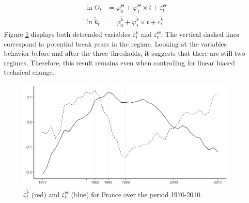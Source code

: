 \begin{align*}
	\ln \Theta_t &= \varphi_0^\Theta + \varphi_1^\Theta \times t + \varepsilon_t^\Theta \\
	\ln \tilde{k}_t &= \varphi_0^{\tilde{k}} + \varphi_1^{\tilde{k}} \times t + \varepsilon_t^{\tilde{k}}
\end{align*}
Figure \ref{fig:k_Theta_log_detrend} displays both detrended variables $\varepsilon_t^{\tilde{k}}$ and $\varepsilon_t^\Theta$. The vertical dashed lines correspond to potential break years in the regime. Looking at the variables behavior before and after the three thresholds, it suggests that there are still two regimes. Therefore, this result remains even when controlling for linear biased technical change.
\begin{figure}[tb]
	\centering
	\includegraphics[width=1\linewidth]{../result/appendix_CD/k_Theta_log_detrend.png}
	\caption{$\varepsilon_t^{\tilde{k}}$ (red) and $\varepsilon_t^\Theta$ (blue) for France over the period 1970-2010.}
	\label{fig:k_Theta_log_detrend}
\end{figure}


